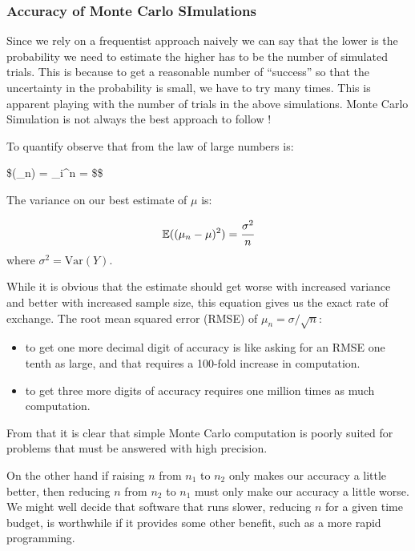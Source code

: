 \documentclass[11pt]{article}
\providecommand{\tightlist}{%
      \setlength{\itemsep}{0pt}\setlength{\parskip}{0pt}}
\begin{document}
    \hypertarget{accuracy-of-monte-carlo-simulations}{%
\subsubsection{Accuracy of Monte Carlo
SImulations}\label{accuracy-of-monte-carlo-simulations}}

Since we rely on a frequentist approach naively we can say that the
lower is the probability we need to estimate the higher has to be the
number of simulated trials. This is because to get a reasonable number
of ``success'' so that the uncertainty in the probability is small, we
have to try many times. This is apparent playing with the number of
trials in the above simulations. Monte Carlo Simulation is not always
the best approach to follow !

To quantify observe that from the law of large numbers is:

\$(\mu\_n) = \sum\_i\^{}n  = \mu \$\$

The variance on our best estimate of \(\mu\) is:

\[ \mathbb{E}((\mu_n - \mu )^2) = \cfrac{\sigma^2}{n} \] where
\(\sigma^2 = \mathrm{Var}(Y)\).

While it is obvious that the estimate should get worse with increased
variance and better with increased sample size, this equation gives us
the exact rate of exchange. The root mean squared error (RMSE) of
\(\mu_n = \sigma/\sqrt{n}\):

\begin{itemize}
\tightlist
\item
  to get one more decimal digit of accuracy is like asking for an RMSE
  one tenth as large, and that requires a 100-fold increase in
  computation.
\item
  to get three more digits of accuracy requires one million times as
  much computation.
\end{itemize}

From that it is clear that simple Monte Carlo computation is poorly
suited for problems that must be answered with high precision.

On the other hand if raising \(n\) from \(n_1\) to \(n_2\) only makes
our accuracy a little better, then reducing \(n\) from \(n_2\) to
\(n_1\) must only make our accuracy a little worse. We might well decide
that software that runs slower, reducing \(n\) for a given time budget,
is worthwhile if it provides some other benefit, such as a more rapid
programming.
\end{document}
